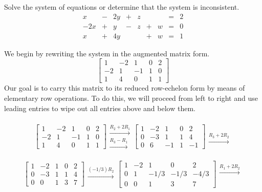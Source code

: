 \documentclass{ximera}
\begin{document}
\begin{example}\label{ex:freevar1} Solve the system of equations or determine that the system is inconsistent.
$$\begin{array}{ccccccccc}
      x &- &2y&+&z&&&= &2 \\
	 -2x& +&y&-&z&+&w&=&0\\
     x& +&4y&&&+&w&=&1 
    \end{array}$$
\begin{explanation}
We begin by rewriting the system in the augmented matrix form.
$$\left[\begin{array}{cccc|c}  
 1&-2&1&0&2\\-2&1&-1&1&0\\1&4&0&1&1
 \end{array}\right]$$
 Our goal is to carry this matrix to its reduced row-echelon form by means of elementary row operations.  To do this, we will proceed from left to right and use leading entries to wipe out all entries above and below them.
 
 $$\left[\begin{array}{cccc|c}  
 1&-2&1&0&2\\-2&1&-1&1&0\\1&4&0&1&1
 \end{array}\right]
 \begin{array}{c}
 \\
 \xrightarrow{R_2+2R_1}\\
\xrightarrow{R_3-R_1}\\
 \end{array}\left[\begin{array}{cccc|c}  
 1&-2&1&0&2\\0&-3&1&1&4\\0&6&-1&1&-1
 \end{array}\right]\begin{array}{c}
 \\
 \\
\xrightarrow{R_3+2R_2}\\
 \end{array}$$
 
 $$\left[\begin{array}{cccc|c}  
 1&-2&1&0&2\\0&-3&1&1&4\\0&0&1&3&7
 \end{array}\right]
 \begin{array}{c}
 \\
 \xrightarrow{(-1/3)R_2}\\
\\
 \end{array}\left[\begin{array}{cccc|c}  
 1&-2&1&0&2\\0&1&-1/3&-1/3&-4/3\\0&0&1&3&7
 \end{array}\right]\begin{array}{c}
 \xrightarrow{R_1+2R_2}\\
 \\
\\
 \end{array}$$
 

\end{explanation}
\end{example}
\end{document}
